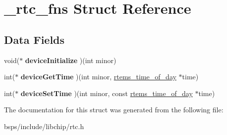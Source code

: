 \hypertarget{struct__rtc__fns}{}\section{\+\_\+rtc\+\_\+fns Struct Reference}
\label{struct__rtc__fns}
\subsection*{Data Fields}
\begin{DoxyCompactItemize}
\item 
\mbox{\label{struct__rtc__fns_a8a46ccabffc7f2d92bdb1c67d80e7b1f}} 
void($\ast$ {\bfseries device\+Initialize} )(int minor)
\item 
\mbox{\label{struct__rtc__fns_aad81851c72cea4060a04227b969520f0}} 
int($\ast$ {\bfseries device\+Get\+Time} )(int minor, \mbox{\hyperlink{structrtems__time__of__day}{rtems\+\_\+time\+\_\+of\+\_\+day}} $\ast$time)
\item 
\mbox{\label{struct__rtc__fns_af4d17c91cebf3f93606bec88cdfe5076}} 
int($\ast$ {\bfseries device\+Set\+Time} )(int minor, const \mbox{\hyperlink{structrtems__time__of__day}{rtems\+\_\+time\+\_\+of\+\_\+day}} $\ast$time)
\end{DoxyCompactItemize}


The documentation for this struct was generated from the following file\+:\begin{DoxyCompactItemize}
\item 
bsps/include/libchip/rtc.\+h\end{DoxyCompactItemize}
